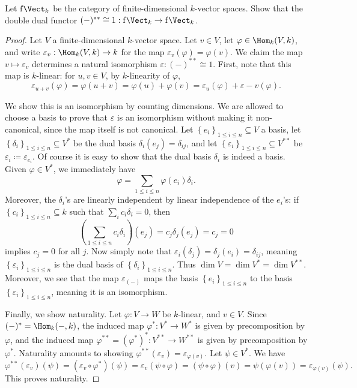 \begin{exercise}
	Let $\mathrm{f}\Vect_{k} $ be the category of finite-dimensional $k$-vector spaces. Show that the double dual functor $(-)^{* *} \cong 1 : \mathrm{f} \Vect_{k}  \to \mathrm{f} \Vect_{k} $.
\end{exercise}
\begin{proof}
	Let $V$ a finite-dimensional $k$-vector space. Let $v\in V$, let $\varphi \in \Hom_{k}(V , k) $, and write $\varepsilon _v : \Hom_{k}(V, k)  \to k$ for the map $\varepsilon _v(\varphi )=\varphi (v)$. We claim the map $v\mapsto \varepsilon _v$ determines a natural isomorphism $\varepsilon : (-)^{* *} \cong 1$. First, note that this map is $k$-linear: for $u,v\in V$, by $k$-linearity of $\varphi $,
	\[
		\varepsilon _{u+v} (\varphi ) = \varphi (u+v) = \varphi (u)+\varphi (v) = \varepsilon _u(\varphi )+\varepsilon -v(\varphi )
	.\]

	We show this is an isomorphism by counting dimensions. We are allowed to choose a basis to prove that $\varepsilon $ is an isomorphism without making it non-canonical, since the map itself is not canonical. Let $\left\{ e_i \right\}_{1\leq i\leq n} \subseteq V$ a basis, let $\left\{ \delta _i \right\}_{1\leq i\leq n} \subseteq V^*$ be the dual basis $\delta _i(e_j)=\delta _{ij} $, and let $\left\{ \varepsilon _i \right\} _{1\leq i\leq n} \subseteq V^{* *} $ be $\varepsilon _i \coloneqq \varepsilon _{e_i} $. Of course it is easy to show that the dual basis $\delta _i$ is indeed a basis. Given $\varphi \in V^*$, we immediately have
	\[
		\varphi =\sum_{1\leq i\leq n} \varphi (e_i)\delta _i
	.\]
	Moreover, the $\delta _i$'s are linearly independent by linear independence of the $e_i$'s: if $\left\{ c_i \right\} _{1\leq i\leq n} \subseteq k$ such that $\sum_{i} c_i\delta _i=0$, then
	\[
		\left( \sum_{1\leq i\leq n} c_i\delta _i \right) (e_j) = c_j\delta _j(e_j) = c_j=0
	\]
	implies $c_j=0$ for all $j$. Now simply note that $\varepsilon _i(\delta _j) = \delta _j(e_i) = \delta _{ij}$, meaning $\left\{ \varepsilon _i \right\} _{1\leq i\leq n} $ is the dual basis of $\left\{ \delta _i \right\} _{1\leq i\leq n} $. Thus $\dim V = \dim V^* = \dim V^{* *} $. Moreover, we see that the map $\varepsilon _{(-)} $ maps the basis $\left\{ e_i \right\} _{1\leq i\leq n} $ to the basis $\left\{ \varepsilon _i \right\} _{1\leq i\leq n} $, meaning it is an isomorphism.

	Finally, we show naturality. Let $\varphi : V \to W$ be $k$-linear, and $v\in V$. Since $(-)^* = \Hom_{k}(-, k) $, the induced map $\varphi ^* : V^* \to W^*$ is given by precomposition by $\varphi $, and the induced map $\varphi ^{* *} = (\varphi ^*)^* : V^{* *}  \to W^{* *} $ is given by precomposition by $\varphi ^*$. Naturality amounts to showing $\varphi ^{* *}(\varepsilon _v) = \varepsilon _{\varphi (v)} $. Let $\psi \in V^*$. We have
	\[
		\varphi ^{* *} (\varepsilon _v)(\psi ) = (\varepsilon _v \circ \varphi ^*)(\psi ) = \varepsilon _v(\psi \circ \varphi ) = (\psi \circ \varphi )(v)=\psi (\varphi (v)) = \varepsilon _{\varphi (v)} (\psi )
	.\]
	This proves naturality.
\end{proof}

